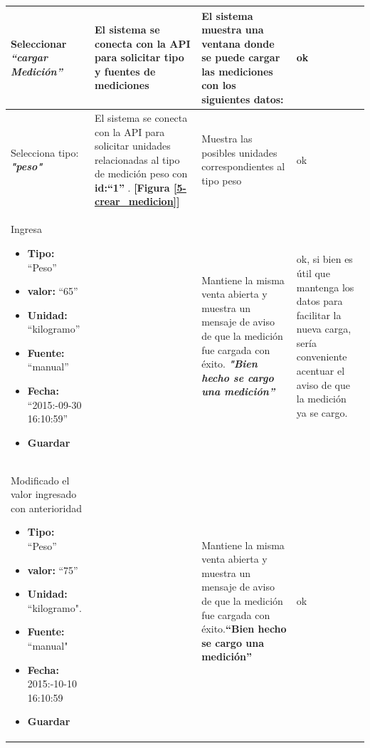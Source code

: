 \documentclass[a4paper,12pt]{article}
\begin{document}
\begin{longtable}{|p{4cm}|p{4cm}|p{4cm}|p{3cm}|}
Seleccionar \textit{\textbf{``cargar Medición'' }}
& El sistema se conecta con la API para solicitar tipo y fuentes de mediciones
& El sistema muestra una ventana donde  se puede cargar las mediciones con los siguientes datos:
\textbf{\begin{itemize}
	\item ``Tipo'',
\item ``Valor''
\item ``Unidad''
\item ``Fuente''
\item ``Fecha''
\end{itemize}}
\textbf{[Figura \ref{5-cargar_medicion}]}
& ok
\\ \hline




Selecciona tipo:\textit{\textbf{ "peso"} }
	& El sistema se conecta con la API para
solicitar unidades relacionadas al tipo de medición peso con \textbf{id:``1'' }. \textbf{[Figura \ref{5-crear_medicion}]}
& Muestra las posibles unidades correspondientes al tipo peso
& ok
\\ \hline



Ingresa
\begin{itemize}
	\item \textbf{Tipo:} ``Peso''
	\item \textbf{valor: }``65''
	\item \textbf{Unidad:} ``kilogramo''
	\item \textbf{Fuente: }``manual''
	\item \textbf{Fecha: }``2015:-09-30 16:10:59''
	\item \textbf{ Guardar}
\end{itemize}
&
& Mantiene la misma venta abierta y muestra un mensaje de aviso de que la
medición fue cargada con éxito.\textit{ \textbf{"Bien hecho se cargo una medición''}}
& ok, si bien es útil que mantenga los datos para facilitar la nueva carga, sería conveniente acentuar el aviso de que la medición ya se cargo.
\\ \hline





Modificado el valor ingresado con anterioridad

\begin{itemize}
	\item \textbf{Tipo:} ``Peso''
	\item \textbf{valor: }``75''
	\item \textbf{Unidad:} ``kilogramo".
	\item \textbf{Fuente: }``manual"
	\item \textbf{Fecha: }2015:-10-10 16:10:59
	\item \textbf{ Guardar}
\end{itemize}
&
& Mantiene la misma venta abierta y muestra un mensaje de aviso de que la
medición fue cargada con éxito.\textbf{``Bien hecho se cargo una medición''}
& ok
\\ \hline





\end{longtable}
\end{document}
